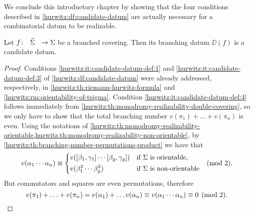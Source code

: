 We conclude this introductory chapter by showing that the four conditions described in \cref{hurwitz:df:candidate-datum} are actually necessary for a combinatorial datum to be realizable.

\begin{proposition}\label{hurwitz:th:candidate-datum-necessary-conditions}
Let $\map{f}{\tSigma}{\Sigma}$ be a branched covering. Then its branching datum $\DD(f)$ is a candidate datum.
\end{proposition}
\begin{proof}
Conditions \ref{hurwitz:it:candidate-datum-def:1} and \ref{hurwitz:it:candidate-datum-def:3} of \cref{hurwitz:df:candidate-datum} were already addressed, respectively, in \cref{hurwitz:th:riemann-hurwitz-formula} and \cref{hurwitz:rm:orientability-of-tsigma}. Condition \ref{hurwitz:it:candidate-datum-def:4} follows immediately from \cref{hurwitz:th:monodromy-realizability-double-covering}, so we only have to show that the total branching number $v(\pi_1)+\ldots+v(\pi_n)$ is even. Using the notations of \cref{hurwitz:th:monodromy-realizability-orientable,hurwitz:th:monodromy-realizability-non-orientable}, by \cref{hurwitz:th:branching-number-permutations-product} we have that
\[
v(\alpha_1\cdots\alpha_n)\equiv
\begin{dcases*}
v([\beta_1,\gamma_1]\cdots[\beta_g,\gamma_g])&if $\Sigma$ is orientable,\\
v(\beta_1^2\cdots\beta_g^2)&if $\Sigma$ is non-orientable
\end{dcases*}
\pmod{2}.
\]
But commutators and squares are even permutations, therefore
\[
v(\pi_1)+\ldots+v(\pi_n)=v(\alpha_1)+\ldots v(\alpha_n)\equiv v(\alpha_1\cdots\alpha_n)\equiv 0\pmod{2}.\qedhere
\]
\end{proof}